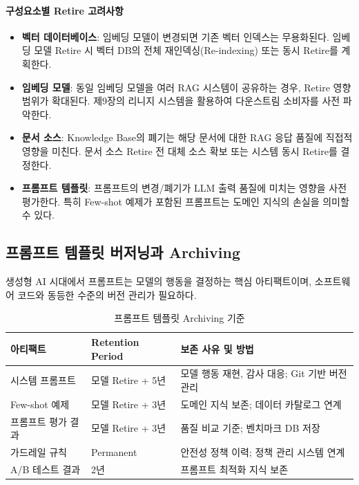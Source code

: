 \paragraph{구성요소별 Retire 고려사항}

\begin{itemize}
 \item \textbf{벡터 데이터베이스}: 임베딩 모델이 변경되면 기존 벡터 인덱스는 무용화된다. 임베딩 모델 Retire 시 벡터 DB의 전체 재인덱싱(Re-indexing) 또는 동시 Retire를 계획한다.
 \item \textbf{임베딩 모델}: 동일 임베딩 모델을 여러 RAG 시스템이 공유하는 경우, Retire 영향 범위가 확대된다. 제9장의 리니지 시스템을 활용하여 다운스트림 소비자를 사전 파악한다.
 \item \textbf{문서 소스}: Knowledge Base의 폐기는 해당 문서에 대한 RAG 응답 품질에 직접적 영향을 미친다. 문서 소스 Retire 전 대체 소스 확보 또는 시스템 동시 Retire를 결정한다.
 \item \textbf{프롬프트 템플릿}: 프롬프트의 변경/폐기가 LLM 출력 품질에 미치는 영향을 사전 평가한다. 특히 Few-shot 예제가 포함된 프롬프트는 도메인 지식의 손실을 의미할 수 있다.
\end{itemize}

\subsection{프롬프트 템플릿 버저닝과 Archiving}
\label{sec:12.3b.3}

생성형 AI 시대에서 프롬프트는 모델의 행동을 결정하는 핵심 아티팩트이며, 소프트웨어 코드와 동등한 수준의 버전 관리가 필요하다.

\begin{table}[htbp]
\centering
\caption{프롬프트 템플릿 Archiving 기준}
\label{tab:prompt_archiving}
\begin{tabularx}{\textwidth}{p{3cm}p{2.5cm}X}
\toprule
\textbf{아티팩트} & \textbf{Retention Period} & \textbf{보존 사유 및 방법} \\
\midrule
시스템 프롬프트 &
모델 Retire + 5년 &
모델 행동 재현, 감사 대응; Git 기반 버전 관리 \\
\midrule
Few-shot 예제 &
모델 Retire + 3년 &
도메인 지식 보존; 데이터 카탈로그 연계 \\
\midrule
프롬프트 평가 결과 &
모델 Retire + 3년 &
품질 비교 기준; 벤치마크 DB 저장 \\
\midrule
가드레일 규칙 &
Permanent &
안전성 정책 이력; 정책 관리 시스템 연계 \\
\midrule
A/B 테스트 결과 &
2년 &
프롬프트 최적화 지식 보존 \\
\bottomrule
\end{tabularx}
\end{table}

